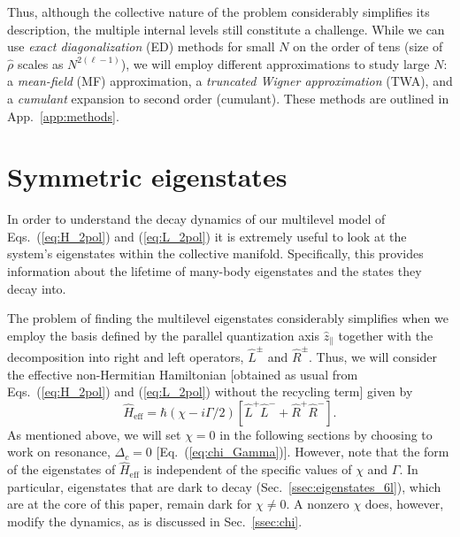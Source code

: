 \documentclass[aps,prx,superscriptaddress,twocolumn,notitlepage,nofootinbib,longbibliography]{revtex4-2}
\newcommand{\quv}{\hat{z}}
\begin{document}
Thus, although the collective nature of the problem considerably simplifies its description, the multiple internal levels still constitute a challenge. While we can use \emph{exact diagonalization} (ED) methods for small $N$ on the order of tens (size of $\hat\rho$ scales as $N^{2(\ell-1)}$), we will employ different approximations to study large $N$: a \emph{mean-field} (MF) approximation, a \emph{truncated Wigner approximation} (TWA), and a \emph{cumulant} expansion to second order (cumulant). These methods are outlined in App.~\ref{app:methods}.










\section{Symmetric eigenstates\label{sec:eigenstates}}

In order to understand the decay dynamics of our multilevel model of Eqs.~(\ref{eq:H_2pol}) and (\ref{eq:L_2pol}) it is extremely useful to look at the system's eigenstates within the collective manifold. Specifically, this provides information about the lifetime of many-body  eigenstates and the states they decay into.

The problem of finding the multilevel eigenstates considerably simplifies when we employ the basis defined by the parallel quantization axis $\quv_\parallel$ together with the decomposition into right and left operators, $\hat{L}^\pm$ and $\hat{R}^\pm$.
Thus, we will consider the effective non-Hermitian Hamiltonian [obtained as usual from Eqs.~(\ref{eq:H_2pol}) and (\ref{eq:L_2pol}) without the recycling term] given by
\begin{equation}
	\hat{H}_\text{eff} = \hbar(\chi-i\Gamma/2) \left[ \hat{L}^+\hat{L}^- + \hat{R}^+ \hat{R}^- \right] .
\label{eq:Heff_LR}
\end{equation}
As mentioned above, we will set $\chi=0$ in the following sections by choosing to work on resonance, $\Delta_c=0$ [Eq.~(\ref{eq:chi_Gamma})]. However, note that the form of the eigenstates of $\hat{H}_\text{eff}$ is independent of the specific values of $\chi$ and $\Gamma$.
In particular, eigenstates that are dark to decay (Sec.~\ref{ssec:eigenstates_6l}), which are at the core of this paper, remain dark for $\chi\neq0$.
A nonzero $\chi$ does, however, modify the dynamics, as is discussed in Sec.~\ref{ssec:chi}.
\end{document}
